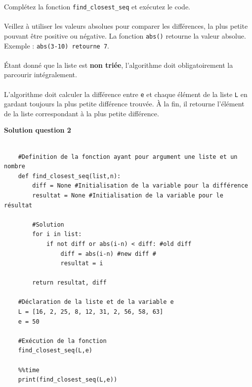 \begin{Exercice}[10 minutes]
    \begin{conseil}
        Complétez la fonction \lstinline{find_closest_seq} et exécutez le code.\\\\
        Veillez à utiliser les valeurs absolues pour comparer les différences, la plus petite pouvant être positive ou négative. La fonction \lstinline{abs()} retourne la valeur absolue. Exemple : \lstinline{abs(3-10) retourne 7}.\\\\
        Étant donné que la liste est \textbf{non triée}, l'algorithme doit obligatoirement la parcourir intégralement.\\\\
        L'algorithme doit calculer la différence entre \lstinline{e} et chaque élément de la liste \lstinline{L} en gardant toujours la plus petite différence trouvée. À la fin, il retourne l'élément de la liste correspondant à la plus petite différence.  
    \end{conseil}
    
    \textbf{Solution question 2}
    
    \begin{verbatim}
    
    #Definition de la fonction ayant pour argument une liste et un nombre 
    def find_closest_seq(list,n):
        diff = None #Initialisation de la variable pour la différence
        resultat = None #Initialisation de la variable pour le résultat
        
        #Solution
        for i in list:
            if not diff or abs(i-n) < diff: #old diff
                diff = abs(i-n) #new diff # 
                resultat = i
                
        return resultat, diff
    
    #Déclaration de la liste et de la variable e
    L = [16, 2, 25, 8, 12, 31, 2, 56, 58, 63]  
    e = 50
    
    #Exécution de la fonction
    find_closest_seq(L,e)
    
    %%time 
    print(find_closest_seq(L,e))
    
    \end{verbatim}
    
\end{Exercice}

